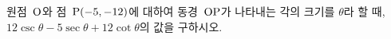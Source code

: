 원점~$\mathrm{O}$와 점~$\mathrm{P}(-5{,}\mkern3mu\mathopen{}-12)$에 대하여 동경~$\mathrm{OP}$가 나타내는 각의 크기를 $\theta$라 할 때, $12\csc\theta-5\sec\theta+12\cot\theta$의 값을 구하시오.
